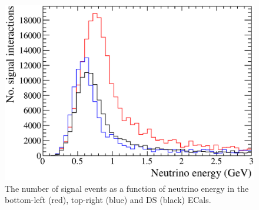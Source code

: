 \begin{figure}
  \centering
  \includegraphics[width=12cm]{images/selection/signal_definition/NSignalEventsNeutrinoEnergy.eps}
  \caption{The number of signal events as a function of neutrino energy in the bottom-left (red), top-right (blue) and DS (black) ECals.}
  \label{fig:NSignalEventsTruthNeutrinoEnergy}
\end{figure}
